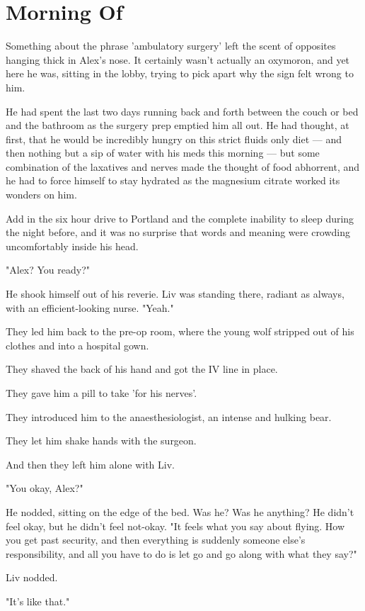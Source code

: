 \chapter{Morning Of}

Something about the phrase 'ambulatory surgery' left the scent of opposites hanging thick in Alex's nose. It certainly wasn't actually an oxymoron, and yet here he was, sitting in the lobby, trying to pick apart why the sign felt wrong to him.

He had spent the last two days running back and forth between the couch or bed and the bathroom as the surgery prep emptied him all out. He had thought, at first, that he would be incredibly hungry on this strict fluids only diet --- and then nothing but a sip of water with his meds this morning --- but some combination of the laxatives and nerves made the thought of food abhorrent, and he had to force himself to stay hydrated as the magnesium citrate worked its wonders on him.

Add in the six hour drive to Portland and the complete inability to sleep during the night before, and it was no surprise that words and meaning were crowding uncomfortably inside his head.

"Alex? You ready?"

He shook himself out of his reverie. Liv was standing there, radiant as always, with an efficient-looking nurse. "Yeah."

They led him back to the pre-op room, where the young wolf stripped out of his clothes and into a hospital gown.

They shaved the back of his hand and got the IV line in place.

They gave him a pill to take 'for his nerves'.

They introduced him to the anaesthesiologist, an intense and hulking bear.

They let him shake hands with the surgeon.

And then they left him alone with Liv.

"You okay, Alex?"

He nodded, sitting on the edge of the bed. Was he? Was he anything? He didn't feel okay, but he didn't feel not-okay. "It feels what you say about flying. How you get past security, and then everything is suddenly someone else's responsibility, and all you have to do is let go and go along with what they say?"

Liv nodded.

"It's like that."

